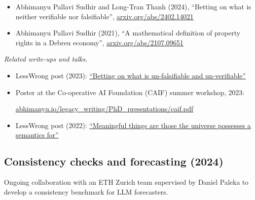 \documentclass{article}
\newenvironment{relatedwork}
   {
     \begin{mdframed}[
       leftmargin=1cm,
       rightmargin=0cm,
       innerleftmargin=10pt,
       innerrightmargin=0pt,
       innertopmargin=0.5em,
       innerbottommargin=0.5em,
       linewidth=1pt,
       linecolor=gray,
       topline=false,
       bottomline=false,
       rightline=false
     ]
     \footnotesize
   }
   {
     \end{mdframed}
   }
\begin{document}
\begin{itemize}

    \item
          Abhimanyu Pallavi Sudhir and Long-Tran Thanh (2024), ``Betting on what is neither verifiable nor falsifiable'', \href{https://arxiv.org/abs/2402.14021}{arxiv.org/abs/2402.14021}

    \item
          Abhimanyu Pallavi Sudhir (2021),
          ``A mathematical definition of property rights in a Debreu economy'',
          \href{https://arxiv.org/abs/2107.09651}{arxiv.org/abs/2107.09651}

\end{itemize}

\begin{relatedwork}
    \emph{Related write-ups and talks.}
    \begin{itemize}[label=—]
        \item LessWrong post (2023): \href{https://www.lesswrong.com/posts/id84oe3LxdzoqinKA/betting-on-what-is-un-falsifiable-and-un-verifiable}{``Betting on what is un-falsifiable and un-verifiable''}
        \item Poster at the Co-operative AI Foundation (CAIF) summer workshop, 2023:

              \href{https://abhimanyu.io/legacy_writing/PhD_presentations/caif.pdf}{abhimanyu.io/legacy\_writing/PhD\_presentations/caif.pdf}
        \item LessWrong post (2022): \href{https://www.lesswrong.com/posts/xqxXrAohXSD3akYCg/meaningful-things-are-those-the-universe-possesses-a}{``Meaningful things are those the universe possesses a semantics for''}
    \end{itemize}
\end{relatedwork}

\subsection*{Consistency checks and forecasting (2024)}

Ongoing collaboration with an ETH Zurich team supervised by Daniel Paleka to develop a consistency benchmark for LLM forecasters.
\end{document}

